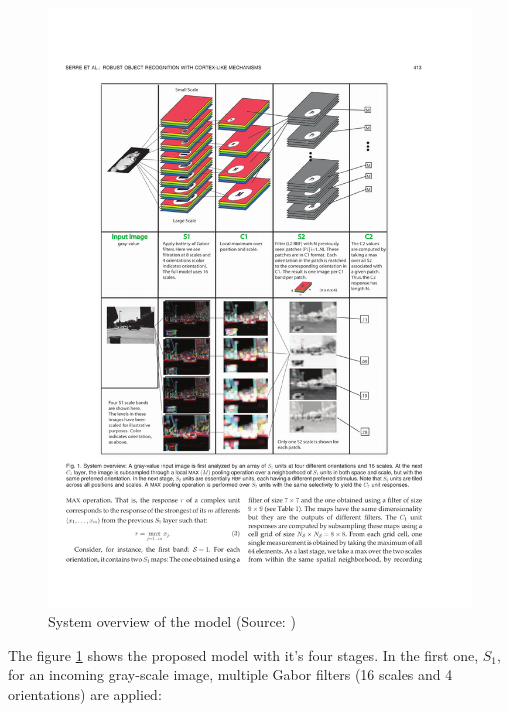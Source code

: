 			\begin{figure}[H]
				\centering
				\captionsetup{justification=centering,margin=1cm}
				\includegraphics[width=\textwidth, trim= 2.5cm 18.2cm 4cm 3.5cm, clip]{images/serre-appearance-based-model.pdf}					%
				\caption{System overview of the model (Source: \citep{serre2007robust})}
				\label{serre-model}
			\end{figure}
			
			The figure \ref{serre-model} shows the proposed model with it's four stages. In the first one, $ S_1 $, for an incoming gray-scale image, multiple Gabor filters (16 scales and 4 orientations) are applied:
			
